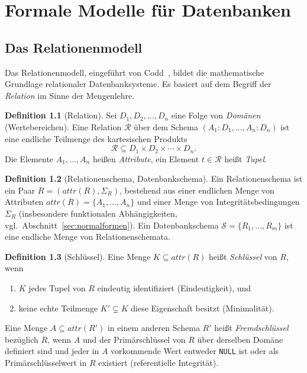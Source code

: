 ﻿\documentclass[a4paper,12pt]{report}
\theoremstyle{definition}
\newtheorem{definition}{Definition}[chapter]
\theoremstyle{remark}
\newcommand{\R}{\mathcal{R}}
\newcommand{\att}{\mathit{attr}}
\begin{document}
\chapter{Formale Modelle für Datenbanken}
\label{ch:modelle}

\section{Das Relationenmodell}
\label{sec:relmodell}

Das Relationenmodell, eingeführt von Codd~\cite{Codd1970}, bildet die
mathematische Grundlage relationaler Datenbanksysteme. Es basiert auf
dem Begriff der \emph{Relation} im Sinne der Mengenlehre.

\begin{definition}[Relation]
\label{def:relation}
Sei $D_1, D_2, \ldots, D_n$ eine Folge von \emph{Domänen} (Wertebereichen).
Eine Relation $\R$ über dem Schema $(A_1:D_1, \ldots, A_n:D_n)$ ist eine
endliche Teilmenge des kartesischen Produkts
\[
  \R \subseteq D_1 \times D_2 \times \cdots \times D_n .
\]
Die Elemente $A_1,\ldots,A_n$ heißen \emph{Attribute}, ein Element
$t \in \R$ heißt \emph{Tupel}.
\end{definition}

\begin{definition}[Relationenschema, Datenbankschema]
\label{def:relschema}
Ein Relationenschema ist ein Paar $R = (\att(R), \Sigma_R)$, bestehend
aus einer endlichen Menge von Attributen $\att(R) = \{A_1,\ldots,A_n\}$
und einer Menge von Integritätsbedingungen $\Sigma_R$ (insbesondere
funktionalen Abhängigkeiten, vgl.\ Abschnitt~\ref{sec:normalformen}). Ein
Datenbankschema $\mathcal{S} = \{R_1,\ldots,R_m\}$ ist eine endliche
Menge von Relationenschemata.
\end{definition}

\begin{definition}[Schlüssel]
\label{def:schluessel}
Eine Menge $K \subseteq \att(R)$ heißt \emph{Schlüssel} von $R$, wenn
\begin{enumerate}
  \item $K$ jedes Tupel von $R$ eindeutig identifiziert (Eindeutigkeit), und
  \item keine echte Teilmenge $K' \subsetneq K$ diese Eigenschaft besitzt
    (Minimalität).
\end{enumerate}
Eine Menge $A \subseteq \att(R')$ in einem anderen Schema $R'$ heißt
\emph{Fremdschlüssel} bezüglich $R$, wenn $A$ und der Primärschlüssel von
$R$ über derselben Domäne definiert sind und jeder in $A$ vorkommende
Wert entweder \texttt{NULL} ist oder als Primärschlüsselwert in $R$
existiert (referentielle Integrität).
\end{definition}
\end{document}
